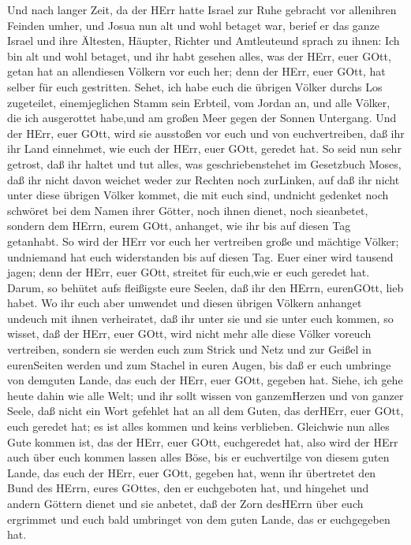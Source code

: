  Und nach langer Zeit, da der HErr hatte Israel zur Ruhe
gebracht vor allenihren Feinden umher, und Josua nun alt und wohl
betaget war,  berief er das ganze Israel und ihre Ältesten,
Häupter, Richter und Amtleuteund sprach zu ihnen: Ich bin alt und wohl
betaget,  und ihr habt gesehen alles, was der HErr, euer
GOtt, getan hat an allendiesen Völkern vor euch her; denn der HErr, euer
GOtt, hat selber für euch gestritten.  Sehet, ich habe euch
die übrigen Völker durchs Los zugeteilet, einemjeglichen Stamm sein
Erbteil, vom Jordan an, und alle Völker, die ich ausgerottet habe,und am
großen Meer gegen der Sonnen Untergang.  Und der HErr, euer
GOtt, wird sie ausstoßen vor euch und von euchvertreiben, daß ihr ihr
Land einnehmet, wie euch der HErr, euer GOtt, geredet hat. 
So seid nun sehr getrost, daß ihr haltet und tut alles, was
geschriebenstehet im Gesetzbuch Moses, daß ihr nicht davon weichet weder
zur Rechten noch zurLinken,  auf daß ihr nicht unter diese
übrigen Völker kommet, die mit euch sind, undnicht gedenket noch
schwöret bei dem Namen ihrer Götter, noch ihnen dienet, noch sieanbetet,
 sondern dem HErrn, eurem GOtt, anhanget, wie ihr bis auf
diesen Tag getanhabt.  So wird der HErr vor euch her
vertreiben große und mächtige Völker; undniemand hat euch widerstanden
bis auf diesen Tag.  Euer einer wird tausend jagen; denn
der HErr, euer GOtt, streitet für euch,wie er euch geredet hat.
 Darum, so behütet aufs fleißigste eure Seelen, daß ihr den
HErrn, eurenGOtt, lieb habet.  Wo ihr euch aber umwendet
und diesen übrigen Völkern anhanget undeuch mit ihnen verheiratet, daß
ihr unter sie und sie unter euch kommen,  so wisset, daß
der HErr, euer GOtt, wird nicht mehr alle diese Völker voreuch
vertreiben, sondern sie werden euch zum Strick und Netz und zur Geißel
in eurenSeiten werden und zum Stachel in euren Augen, bis daß er euch
umbringe von demguten Lande, das euch der HErr, euer GOtt, gegeben hat.
 Siehe, ich gehe heute dahin wie alle Welt; und ihr sollt
wissen von ganzemHerzen und von ganzer Seele, daß nicht ein Wort
gefehlet hat an all dem Guten, das derHErr, euer GOtt, euch geredet hat;
es ist alles kommen und keins verblieben.  Gleichwie nun
alles Gute kommen ist, das der HErr, euer GOtt, euchgeredet hat, also
wird der HErr auch über euch kommen lassen alles Böse, bis er
euchvertilge von diesem guten Lande, das euch der HErr, euer GOtt,
gegeben hat,  wenn ihr übertretet den Bund des HErrn, eures
GOttes, den er euchgeboten hat, und hingehet und andern Göttern dienet
und sie anbetet, daß der Zorn desHErrn über euch ergrimmet und euch bald
umbringet von dem guten Lande, das er euchgegeben hat.

